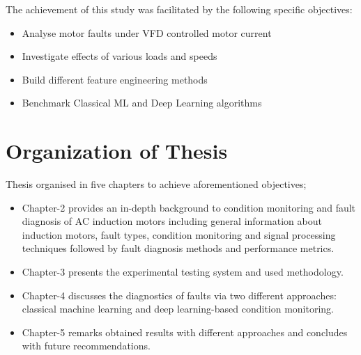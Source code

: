 The achievement of this study was facilitated by the following specific objectives:
\begin{itemize}
\item Analyse motor faults under VFD controlled motor current
\item Investigate effects of various loads and speeds
\item Build different feature engineering methods 
\item Benchmark Classical ML and Deep Learning algorithms 
\end{itemize}

\section{Organization of Thesis}
\label{organization}

Thesis organised in five chapters to achieve aforementioned objectives;
\begin{itemize}
\item Chapter-2 provides an in-depth background to condition monitoring and fault diagnosis of AC induction motors including general information about induction motors, fault types, condition monitoring and signal processing techniques followed by fault diagnosis methods and performance metrics.

\item Chapter-3 presents the experimental testing system and used methodology.

\item Chapter-4 discusses the diagnostics of faults via two different approaches: classical machine learning and deep learning-based condition monitoring.

\item Chapter-5 remarks obtained results with different approaches and concludes with future recommendations.

\end{itemize}